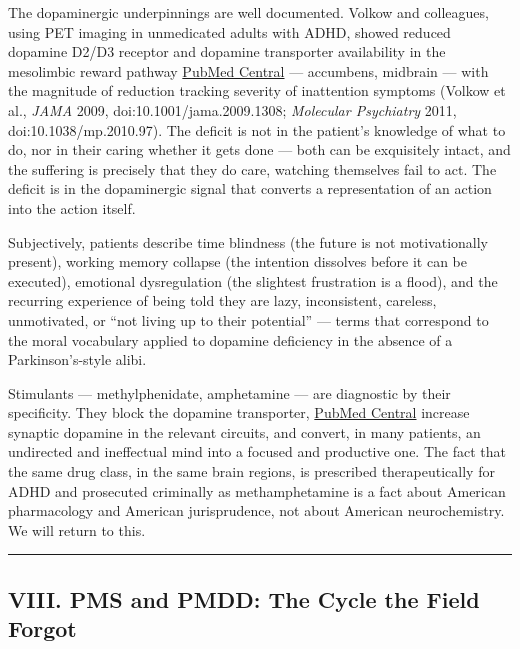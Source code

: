 The dopaminergic underpinnings are well documented. Volkow and colleagues, using PET imaging in unmedicated adults with ADHD, showed reduced dopamine D2/D3 receptor and dopamine transporter availability in the mesolimbic reward pathway \href{https://pmc.ncbi.nlm.nih.gov/articles/PMC2958516/}{PubMed Central} --- accumbens, midbrain --- with the magnitude of reduction tracking severity of inattention symptoms (Volkow et al., \emph{JAMA} 2009, doi:10.1001/jama.2009.1308; \emph{Molecular Psychiatry} 2011, doi:10.1038/mp.2010.97). The deficit is not in the patient's knowledge of what to do, nor in their caring whether it gets done --- both can be exquisitely intact, and the suffering is precisely that they do care, watching themselves fail to act. The deficit is in the dopaminergic signal that converts a representation of an action into the action itself.

Subjectively, patients describe time blindness (the future is not motivationally present), working memory collapse (the intention dissolves before it can be executed), emotional dysregulation (the slightest frustration is a flood), and the recurring experience of being told they are lazy, inconsistent, careless, unmotivated, or ``not living up to their potential'' --- terms that correspond to the moral vocabulary applied to dopamine deficiency in the absence of a Parkinson's-style alibi.

Stimulants --- methylphenidate, amphetamine --- are diagnostic by their specificity. They block the dopamine transporter, \href{https://pmc.ncbi.nlm.nih.gov/articles/PMC5398319/}{PubMed Central} increase synaptic dopamine in the relevant circuits, and convert, in many patients, an undirected and ineffectual mind into a focused and productive one. The fact that the same drug class, in the same brain regions, is prescribed therapeutically for ADHD and prosecuted criminally as methamphetamine is a fact about American pharmacology and American jurisprudence, not about American neurochemistry. We will return to this.

\begin{center}\rule{0.5\linewidth}{0.5pt}\end{center}

\subsection{VIII. PMS and PMDD: The Cycle the Field Forgot}\label{09_dopamine_spectrum-viii.-pms-and-pmdd-the-cycle-the-field-forgot}

